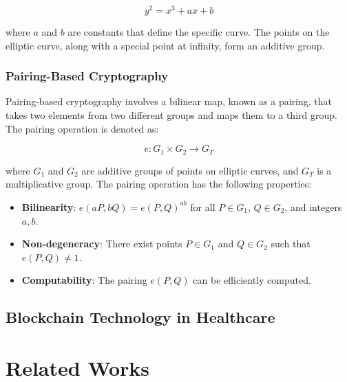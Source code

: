 \documentclass[cic,tc,english]{iiufrgs}
\begin{document}
        \begin{equation}
        y^2 = x^3 + ax + b
        \end{equation}

        where \(a\) and \(b\) are constants that define the specific curve. The points on the elliptic curve, along with a special point at infinity, form an additive group.

        \subsection{Pairing-Based Cryptography}

        Pairing-based cryptography involves a bilinear map, known as a pairing, that takes two elements from two different groups and maps them to a third group. The pairing operation is denoted as:

        \begin{equation}
        e: G_1 \times G_2 \rightarrow G_T
        \end{equation}

        where \(G_1\) and \(G_2\) are additive groups of points on elliptic curves, and \(G_T\) is a multiplicative group. The pairing operation has the following properties:

        \begin{itemize}
            \item \textbf{Bilinearity}: \(e(aP, bQ) = e(P, Q)^{ab}\) for all \(P \in G_1\), \(Q \in G_2\), and integers \(a, b\).
            \item \textbf{Non-degeneracy}: There exist points \(P \in G_1\) and \(Q \in G_2\) such that \(e(P, Q) \neq 1\).
            \item \textbf{Computability}: The pairing \(e(P, Q)\) can be efficiently computed.
        \end{itemize}        

    \section{Blockchain Technology in Healthcare}
        \label{sec:blockchain}


\chapter{Related Works}
    \label{chap:relatedworks}
\end{document}
